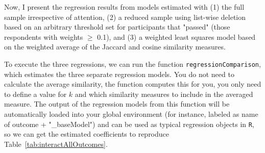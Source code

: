 \documentclass[12pt,letterpaper]{article}
\begin{document}
Now, I present the regression results from models estimated with (1) the full sample irrespective of attention, (2) a reduced sample using list-wise deletion based on an arbitrary threshold set for participants that "passed" (those respondents with weights $\geq$ 0.1), and (3)  a weighted least squares model based on the weighted average of the Jaccard and cosine similarity measures.

To execute the three regressions, we can run the function \texttt{\footnotesize regressionComparison}, which estimates the three separate regression models. You do not need to calculate the average similarity, the function computes this for you, you only need to define a value for $k$ and which similarity measures to include in the averaged measure. The output of the regression models from this function will be automatically loaded into your global environment (for instance, labeled as name of outcome + "\_baseModel") and can be used as typical regression objects in \texttt{R}, so we can get the estimated coefficients to reproduce Table~\ref{tab:interactAllOutcomes}.


\end{document}
